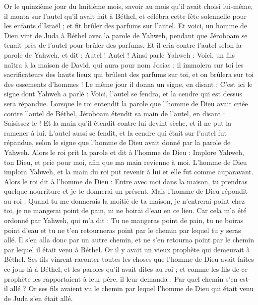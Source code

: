 \begin{multicols}{2}
Or le quinzième jour du huitième mois, savoir au mois qu'il avait choisi lui-même, il monta sur l'autel qu'il avait fait à Béthel, et célébra cette fête solennelle pour les enfants d'Israël ; et fit brûler des parfums sur l'autel.
\VerseOne{}Et voici, un homme de Dieu vint de Juda à Béthel avec la parole de Yahweh, pendant que Jéroboam se tenait près de l'autel pour brûler des parfums.
Et il cria contre l'autel selon la parole de Yahweh, et dit : Autel ! Autel ! Ainsi parle Yahweh : Voici, un fils naîtra à la maison de David, qui aura pour nom Josias ; il immolera sur toi les sacrificateurs des hauts lieux qui brûlent des parfums sur toi, et on brûlera sur toi des ossements d'hommes !
Le même jour il donna un signe, en disant : C'est ici le signe dont Yahweh a parlé : Voici, l'autel se fendra, et la cendre qui est dessus sera répandue.
Lorsque le roi entendit la parole que l'homme de Dieu avait criée contre l'autel de Béthel, Jéroboam étendit sa main de l'autel, en disant : Saisissez-le ! Et la main qu'il étendit contre lui devint sèche, et il ne put la ramener à lui.
L'autel aussi se fendit, et la cendre qui était sur l'autel fut répandue, selon le signe que l'homme de Dieu avait donné par la parole de Yahweh.
Alors le roi prit la parole et dit à l'homme de Dieu : Implore Yahweh, ton Dieu, et prie pour moi, afin que ma main revienne à moi. L'homme de Dieu implora Yahweh, et la main du roi put revenir à lui et elle fut comme auparavant.
Alors le roi dit à l'homme de Dieu : Entre avec moi dans la maison, tu prendras quelque nourriture et je te donnerai un présent.
Mais l'homme de Dieu répondit au roi : Quand tu me donnerais la moitié de ta maison, je n'entrerai point chez toi, je ne mangerai point de pain, ni ne boirai d'eau en ce lieu.
Car cela m'a été ordonné par Yahweh, qui m'a dit : Tu ne mangeras point de pain, tu ne boiras point d'eau et tu ne t'en retourneras point par le chemin par lequel tu y seras allé.
Il s'en alla donc par un autre chemin, et ne s'en retourna point par le chemin par lequel il était venu à Béthel.
Or il y avait un vieux prophète qui demeurait à Béthel. Ses fils vinrent raconter toutes les choses que l'homme de Dieu avait faites ce jour-là à Béthel, et les paroles qu'il avait dites au roi ; et comme les fils de ce prophète les rapportaient à leur père,
il leur demanda : Par quel chemin s'en est-il allé ? Or ses fils avaient vu le chemin par lequel l'homme de Dieu qui était venu de Juda s'en était allé.

\end{multicols}
